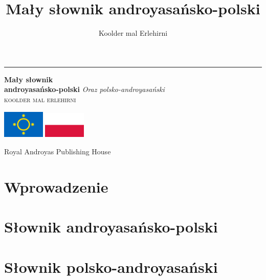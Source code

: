\documentclass[openany, twoside, b5paper]{book}
\begin{document}
\author{Koolder mal Erlehirni}
\title{Mały słownik androyasańsko-polski}

\frontmatter

\begin{titlepage} %
    \newcommand*{\plogo}{\fbox{$\mathcal{AND}$}} %
    
	\raggedleft %
	
	\rule{1pt}{\textheight} %
	\hspace{0.05\textwidth} %
	\parbox[b]{0.75\textwidth}{ %
		
        {\Huge\bfseries Mały słownik\\ androyasańsko-polski}
        {\large\textit{Oraz polsko-androyasański}}\\[4\baselineskip]
		{\Large\textsc{koolder mal erlehirni}} %
        
        \bigskip

        \includegraphics[width=2cm]{androyas-flag}
        \includegraphics[width=2cm]{pl-flag}

        \vspace{0.5\textheight} %
		
		{\noindent Royal Androyas Publishing House~~\plogo}\\[\baselineskip] %
	}

\end{titlepage}

\clearpage


\tableofcontents

\mainmatter
\chapter{Wprowadzenie}




\chapter{Słownik androyasańsko-polski}


\chapter{Słownik polsko-androyasański}


\backmatter
\end{document}
